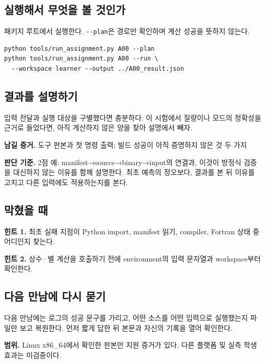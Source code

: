 \documentclass[
  10pt,
  a4paper,
]{article}
\begin{document}
\newpage

\subsection{실행해서 무엇을 볼
것인가}\label{uxc2e4uxd589uxd574uxc11c-uxbb34uxc5c7uxc744-uxbcfc-uxac83uxc778uxac00}

패키지 루트에서 실행한다. \texttt{-\/-plan}은 경로만 확인하며 계산
성공을 뜻하지 않는다.

\begin{verbatim}
python tools/run_assignment.py A00 --plan
python tools/run_assignment.py A00 --run \
  --workspace learner --output ../A00_result.json
\end{verbatim}

\subsection{결과를
설명하기}\label{uxacb0uxacfcuxb97c-uxc124uxba85uxd558uxae30}

입력 전달과 실행 대상을 구별했다면 충분하다. 이 시험에서 질량이나 모드의
정확성을 근거로 들었다면, 아직 계산하지 않은 양을 찾아 설명에서 빼자.

\textbf{남길 증거.} 도구 판본과 첫 명령 출력; 빌드 성공이 아직 증명하지
않은 것 두 가지

\textbf{판단 기준.} 2점 예: manifest→source→binary→input의 연결과,
이것이 방정식 검증을 대신하지 않는 이유를 함께 설명한다. 최초 예측의
정오보다, 결과를 본 뒤 이유를 고치고 다른 입력에도 적용하는지를 본다.

\subsection{막혔을 때}\label{uxb9c9uxd614uxc744-uxb54c}

\textbf{힌트 1.} 최초 실패 지점이 Python import, manifest 읽기,
compiler, Fortran 상태 중 어디인지 찾는다.

\textbf{힌트 2.} 상수·별 계산을 호출하기 전에 environment의 입력
문자열과 workspace부터 확인한다.

\subsection{다음 만남에 다시
묻기}\label{uxb2e4uxc74c-uxb9ccuxb0a8uxc5d0-uxb2e4uxc2dc-uxbb3buxae30}

다음 만남에는 로그의 성공 문구를 가리고, 어떤 소스를 어떤 입력으로
실행했는지 파일만 보고 복원한다. 먼저 짧게 답한 뒤 본문과 자신의 기록을
열어 확인한다.

\textbf{범위.} Linux x86\_64에서 확인한 판본만 지원 증거가 있다. 다른
플랫폼 및 실측 학생 효과는 미검증이다.
\end{document}
